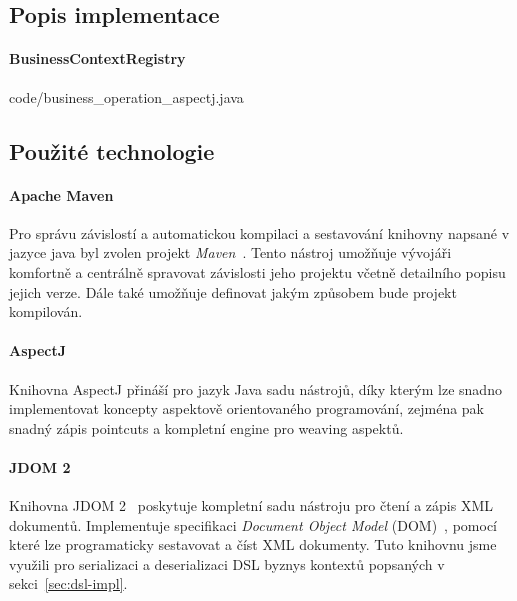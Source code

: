 \subsection{Popis implementace}

\paragraph{BusinessContextRegistry}


{code/business_operation_aspectj.java}

\subsection{Použité technologie}

\paragraph{Apache Maven}

Pro správu závislostí a automatickou kompilaci a sestavování
knihovny napsané v jazyce java byl zvolen projekt \textit{Maven}~\cite{maven}.
Tento nástroj umožňuje vývojáři komfortně a centrálně
spravovat závislosti jeho projektu včetně detailního
popisu jejich verze. Dále také umožňuje definovat jakým
způsobem bude projekt kompilován.

\paragraph{AspectJ}

Knihovna AspectJ přináší pro jazyk Java sadu nástrojů,
díky kterým lze snadno implementovat koncepty aspektově orientovaného
programování, zejména pak snadný zápis pointcuts a kompletní
engine pro weaving aspektů.


\paragraph{JDOM 2}

Knihovna JDOM 2~\cite{jdom2} poskytuje
kompletní sadu nástroju pro čtení a zápis XML dokumentů.
Implementuje specifikaci \textit{Document Object Model} (DOM)~\cite{wood2004document},
pomocí které lze programaticky sestavovat a číst XML dokumenty.
Tuto knihovnu jsme využili pro serializaci a deserializaci
DSL byznys kontextů popsaných v sekci~\ref{sec:dsl-impl}.

